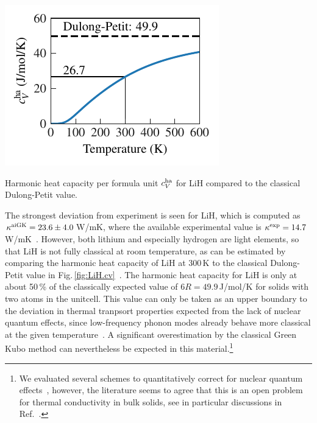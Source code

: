 \begin{marginfigure}
	\includegraphics[width=\textwidth]{./data/plots/heat_capacity/225.LiH/thermal_properties.pdf}
	\caption{Harmonic heat capacity per formula unit $c_V^{\rm ha}$ for LiH compared to the classical Dulong-Petit value.}
	\label{fig:LiH.cv}
\end{marginfigure}
%
The strongest deviation from experiment is seen for LiH, which is computed as $\kappa^{\rm aiGK} = 23.6 \pm 4.0$\,W/mK, where the available experimental value is $\kappa^{\rm exp} = 14.7$\,W/mK~\cite{Slack.1973}. However, both lithium and especially hydrogen are light elements, so that LiH is not fully classical at room temperature, as can be estimated by comparing the harmonic heat capacity of LiH at 300\,K to the classical Dulong-Petit value in Fig.\,\ref{fig:LiH.cv}~\cite{Dove}. The harmonic heat capacity for LiH is only at about 50\,\% of the classically expected value of $6 R = 49.9$\,J/mol/K for solids with two atoms in the unitcell. This value can only be taken as an upper boundary to the deviation in thermal tranpsort properties expected from the lack of nuclear quantum effects, since low-frequency phonon modes already behave more classical at the given temperature~\cite{Volz.2020,Volz.2020b}. A significant overestimation by the classical Green Kubo method can nevertheless be expected in this material.\footnote{We evaluated several schemes to quantitatively correct for nuclear quantum effects~\cite{Wang.1990,Maiti.1997}, however, the literature seems to agree that this is an open problem for thermal conductivity in bulk solids, see in particular discussions in Ref.~\cite{Turney.2009,Puligheddu.2019}.}
